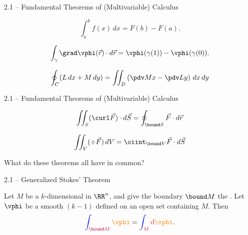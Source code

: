 \documentclass{beamer}
\theoremstyle{plain}
\begin{document}
\begin{frame}{2.1 -- Fundamental Theorems of (Multivariable) Calculus}
\begin{theorem}
  \[
   \int_a^b f(x) \, dx = F(b) - F(a).
  \]  
\end{theorem}
\pause
  \begin{theorem}
   \[
    \int_\gamma \grad \vphi(\vec r) \cdot d\vec r = \vphi(\gamma(1)) -
    \vphi(\gamma(0)).
   \] 
  \end{theorem} 
      \begin{theorem}
     \[
      \oint_C (L \, dx + M \, dy) = \iint_D \left( \pdv M x - \pdv L y \right)
      \, dx \, dy
     \] 
   \end{theorem}
\end{frame}

\begin{frame}{2.1 -- Fundamental Theorems of (Multivariable) Calculus}
      \begin{theorem}
        \[
      \iint_S (\curl \vec F) \cdot d\vec S = \oint_{\bound S} \vec F \cdot
      d\vec r
    \]
   \end{theorem}
   \begin{theorem}
     \[
      \iint_V (\div \vec F) \, d V = \oiint_{\bound V} \vec F \cdot d \vec S
     \] 
   \end{theorem}
   \pause
   \begin{center}
     What do these theorems all have in common?

   \end{center}
\end{frame}

\begin{frame}{2.1 -- Generalized Stokes' Theorem}
 \begin{theorem}
  Let {\color{purple}$M$} be a $k$-dimensional   in $\RR^n$, and give the boundary
  {\color{purple}$\bound M$} the . Let
  {\color{orange}$\vphi$} be a smooth
  {\color{orange}$(k-1)$} defined on an open set
  containing $M$. Then 
  \[
    {\color{blue}\int_{\color{purple}\bound M} {\color{orange}\vphi}} =
    {\color{blue}\int_{\color{purple}
    M} {\color{red}\mathrm{d}} {\color{orange}\vphi}}.
  \] 
\end{theorem} 
\end{frame}
\end{document}
